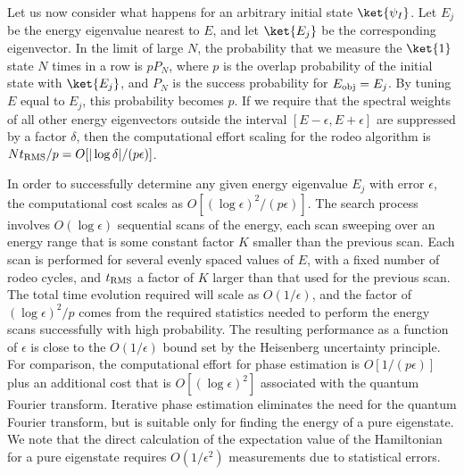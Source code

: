  Let us now consider what happens for an arbitrary initial state $\ket{\psi_I}$.  Let $E_j$ be the energy eigenvalue nearest to $E$, and let $\ket{E_j}$ be the corresponding eigenvector. In the limit of large $N$, the probability that we measure the $\ket{1}$ state $N$ times in a row is $pP_N$, where $p$ is the overlap probability of the initial state with $\ket{E_j}$, and $P_N$ is the success probability for $E_{\rm obj}=E_j$.  By tuning $E$ equal to $E_j$, this probability becomes $p$. If we require that the spectral weights of all other energy eigenvectors outside the interval $[E-\epsilon,  E+\epsilon]$ are suppressed by a factor $\delta$, then the computational effort scaling for the rodeo algorithm is $N t_{\rm RMS}/p = O[|\log \delta|/(p \epsilon)]$. 

In order to successfully determine any given energy eigenvalue $E_j$ with error $\epsilon$, the computational cost scales as $O[(\log \epsilon)^2/(p \epsilon)]$.  The search process involves $O(\log \epsilon)$ sequential scans of the energy, each scan sweeping over an energy range that is some constant factor $K$ smaller than the previous scan. Each scan is performed for several evenly spaced values of $E$, with a fixed number of rodeo cycles, and $t_{\rm RMS}$ a factor of $K$ larger than that used for the previous scan.  The total time evolution required will scale as $O(1/\epsilon)$,  and the factor of $(\log \epsilon)^2/p$ comes from the required statistics needed to perform the energy scans successfully with high probability. The resulting performance as a function of $\epsilon$ is close to the $O(1/\epsilon)$ bound set by the Heisenberg uncertainty principle.  For comparison, the computational effort for phase estimation is $O[1/(p \epsilon)]$ plus an additional cost that is $O[(\log \epsilon)^2]$ associated with the quantum Fourier transform.  Iterative phase estimation eliminates the need for the quantum Fourier transform, but is suitable only for finding the energy of a pure eigenstate.  We note that the direct calculation of the expectation value of the Hamiltonian for a pure eigenstate requires $O(1/\epsilon^2)$ measurements due to statistical errors.

